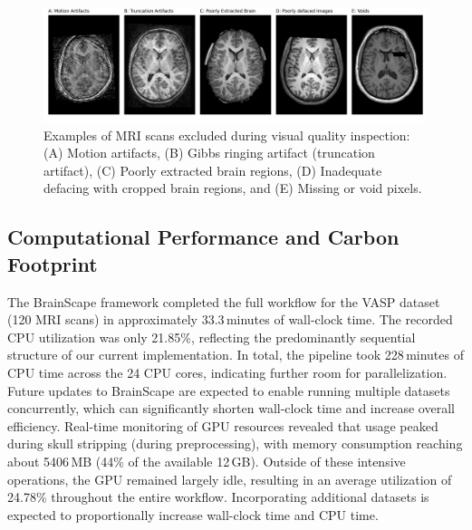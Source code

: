 \begin{figure}[htbp]\begin{center}\includegraphics[width=\linewidth]{figures/dropped_subjects.png}
    \caption{
        Examples of MRI scans excluded during visual quality inspection:
        (A) Motion artifacts, 
        (B) Gibbs ringing artifact (truncation artifact), 
        (C) Poorly extracted brain regions, 
        (D) Inadequate defacing with cropped brain regions, 
        and (E) Missing or void pixels.
    }
    \label{dropped_subject}\end{center}
\end{figure}


\subsection{Computational Performance and Carbon Footprint}

The BrainScape framework completed the full workflow for the VASP dataset (120 MRI scans) in approximately 33.3\,minutes of wall-clock time. 
The recorded CPU utilization was only 21.85\%, reflecting the predominantly sequential structure of our current implementation. 
In total, the pipeline took 228\,minutes of CPU time across the 24 CPU cores, indicating further room for parallelization. 
Future updates to BrainScape are expected to enable running multiple datasets concurrently, 
which can significantly shorten wall-clock time and increase overall efficiency.
Real-time monitoring of GPU resources revealed that usage peaked during skull stripping (during preprocessing), 
with memory consumption reaching about 5406\,MB (44\% of the available 12\,GB). 
Outside of these intensive operations, the GPU remained largely idle, resulting in an average utilization 
of 24.78\% throughout the entire workflow. 
Incorporating additional datasets is expected to proportionally increase wall-clock time and CPU time.

